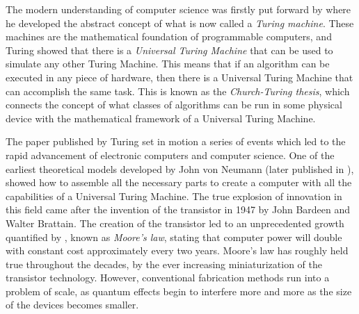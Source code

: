 \documentclass[../../dissertation.tex]{subfiles}
\begin{document}
The modern understanding of computer science was firstly put forward by
\cite{turing1936} where he developed the abstract concept of what is now called
a \textit{Turing machine}. These machines are the mathematical foundation of
programmable computers, and Turing showed that there is a \textit{Universal
Turing Machine} that can be used to simulate any other Turing Machine. This
means that if an algorithm can be executed in any piece of hardware, then there
is a Universal Turing Machine that can accomplish the same task. This is known as
the \textit{Church-Turing thesis}, which connects the concept of what classes
of algorithms can be run in some physical device with the mathematical
framework of a Universal Turing Machine.\par The paper published by Turing set
in motion a series of events which led to the rapid advancement of electronic
computers and computer science. One of the earliest theoretical models
developed by John von Neumann (later published in \cite{Neumann93}),
showed how to assemble all the necessary parts to create a computer with all
the capabilities of a Universal Turing Machine. The true explosion of
innovation in this field came after the invention of the transistor in 1947 by
John Bardeen and Walter Brattain. The creation of the transistor led to an
unprecedented growth quantified by \cite{moore1965}, known as \textit{Moore's law}, stating that computer power will double with constant
cost approximately every two years. Moore's law has roughly held true
throughout the decades, by the ever increasing miniaturization of the
transistor technology. However, conventional fabrication methods run into a
problem of scale, as quantum effects begin to interfere more and more as the size of the
devices becomes smaller.\par
\end{document}
